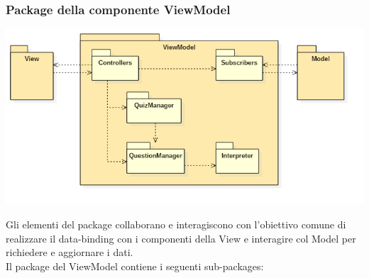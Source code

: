 \subsubsection{Package della componente ViewModel}
	\begin{center}
		\includegraphics[scale=0.6]{../images/ViewModelPackage.png}
	\end{center}
	Gli elementi del package collaborano e interagiscono con l'obiettivo comune di realizzare il data-binding con i componenti della View e interagire col Model per richiedere e aggiornare i dati. \\
	Il package del ViewModel contiene i seguenti sub-packages:
